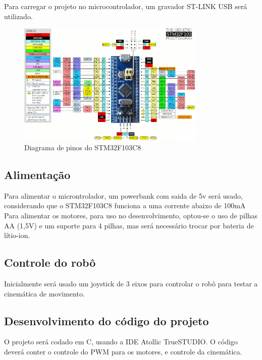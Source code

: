 Para carregar o projeto no microcontrolador, um gravador ST-LINK USB será utilizado.

\begin{figure}[h]
	\centering
	\includegraphics[width=0.8\textwidth]{figures/stm32f1_pinout}
	\caption{Diagrama de pinos do STM32F103C8}
\end{figure}

\subsection{Alimentação}
Para alimentar o microntrolador, um powerbank com saida de 5v será usado, considerando que o STM32F103C8 funciona a uma corrente abaixo de 100mA
Para alimentar os motores, para uso no desenvolvimento, optou-se o uso de pilhas AA (1,5V) e um suporte para 4 pilhas, 
mas será necessário trocar por bateria de lítio-ion.

\subsection{Controle do robô}
Inicialmente será usado um joystick de 3 eixos para controlar o robô para testar a cinemática de movimento.

\subsection{Desenvolvimento do código do projeto}
O projeto será codado em C, usando a IDE Atollic TrueSTUDIO.
O código deverá conter o controle do PWM para os motores, e controle da cinemática.
